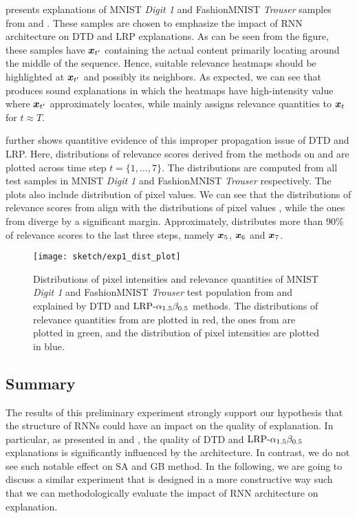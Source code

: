 \addfigure{\ref{fig:class_1_comparison}} presents explanations of MNIST \textit{Digit 1} and FashionMNIST \textit{Trouser} samples from  and . These samples are chosen to emphasize the impact of RNN architecture on DTD and LRP explanations. As can be seen from the figure, these samples have $\boldsymbol{x}_{t'}$ containing the actual content primarily locating around the middle of the sequence. Hence, suitable relevance heatmaps should be highlighted at $\boldsymbol{x}_{t'}$ and possibly its neighbors.  As expected, we can see that  produces sound explanations in which the heatmaps have high-intensity value where $\boldsymbol{x}_{t'}$ approximately locates, while  mainly assigns relevance quantities to $\boldsymbol{x}_{t}$ for $t \approx T$. 

\addfigure{\ref{fig:exp1_dist_plot}} further shows quantitive evidence of this improper propagation issue of DTD and LRP. Here, distributions of relevance scores derived from the methods on  and  are plotted across time step $t = \{ 1, \dots, 7 \}$. The distributions are computed from all test samples in MNIST \textit{Digit 1} and FashionMNIST \textit{Trouser} respectively. The plots also include distribution of pixel  values.  We can see that the distributions of relevance scores from  align with the distributions of pixel values , while  the ones from   diverge by a significant margin. Approximately,  distributes more than 90\% of relevance scores to the last three steps, namely $\boldsymbol{x}_5$, $\boldsymbol{x}_6$ and $\boldsymbol{x}_7$.


 \begin{figure}[!htb]
\centering
\texttt{[image: sketch/exp1\_dist\_plot]}
\caption{Distributions of pixel intensities and relevance quantities of MNIST \textit{Digit 1} and FashionMNIST \textit{Trouser}  test population from  and  explained by DTD and $\text{LRP-}\alpha_{1.5}\beta_{0.5}$ methods. The distributions of relevance quantities from   are plotted in red, the ones from  are plotted in green, and the distribution of pixel intensities are plotted in blue.} 
\label{fig:exp1_dist_plot}
\end{figure}

\subsection{Summary}
The results of this preliminary experiment strongly support our hypothesis that the structure of RNNs could have an impact on the quality of  explanation.  In particular,  as presented in \addfigure{\ref{fig:class_1_comparison}} and \addfigure{\ref{fig:exp1_dist_plot}}, the quality of DTD and $\text{LRP-}\alpha_{1.5}\beta_{0.5}$ explanations is significantly influenced by the architecture. In contrast, we do not see such notable effect on SA and GB method.  In the following, we are going to discuss a similar experiment that is designed in a more constructive way such that we can methodologically evaluate the impact of RNN architecture on explanation.


